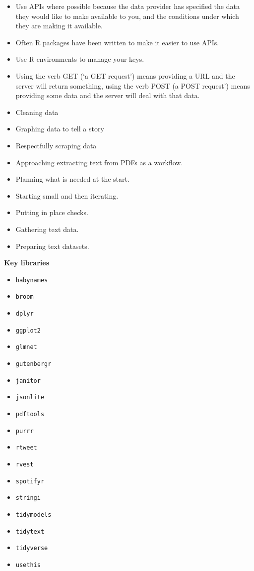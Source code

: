 \documentclass[
]{book}
\providecommand{\tightlist}{%
  \setlength{\itemsep}{0pt}\setlength{\parskip}{0pt}}
\begin{document}
\begin{itemize}
\tightlist
\item
  Use APIs where possible because the data provider has specified the data they would like to make available to you, and the conditions under which they are making it available.
\item
  Often R packages have been written to make it easier to use APIs.
\item
  Use R environments to manage your keys.
\item
  Using the verb GET (`a GET request') means providing a URL and the server will return something, using the verb POST (a POST request') means providing some data and the server will deal with that data.
\item
  Cleaning data
\item
  Graphing data to tell a story
\item
  Respectfully scraping data
\item
  Approaching extracting text from PDFs as a workflow.
\item
  Planning what is needed at the start.
\item
  Starting small and then iterating.
\item
  Putting in place checks.
\item
  Gathering text data.
\item
  Preparing text datasets.
\end{itemize}

\textbf{Key libraries}

\begin{itemize}
\tightlist
\item
  \texttt{babynames}
\item
  \texttt{broom}
\item
  \texttt{dplyr}
\item
  \texttt{ggplot2}
\item
  \texttt{glmnet}
\item
  \texttt{gutenbergr}
\item
  \texttt{janitor}
\item
  \texttt{jsonlite}
\item
  \texttt{pdftools}
\item
  \texttt{purrr}
\item
  \texttt{rtweet}
\item
  \texttt{rvest}
\item
  \texttt{spotifyr}
\item
  \texttt{stringi}
\item
  \texttt{tidymodels}
\item
  \texttt{tidytext}
\item
  \texttt{tidyverse}
\item
  \texttt{usethis}
\end{itemize}
\end{document}
